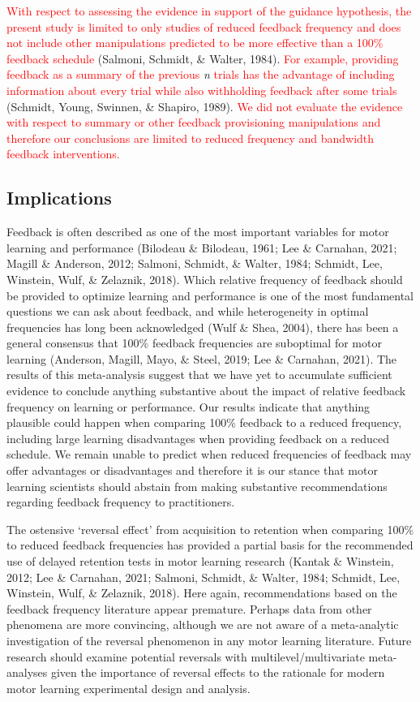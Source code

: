 \documentclass[
  english,
  man, donotrepeattitle,mask,floatsintext]{apa7}
\begin{document}
\textcolor{red}{With respect to assessing the evidence in support of the guidance hypothesis, the present study is limited to only studies of reduced feedback frequency and does not include other manipulations predicted to be more effective than a 100\% feedback schedule} (Salmoni, Schmidt, \& Walter, 1984). \textcolor{red}{For example, providing feedback as a summary of the previous} \emph{n} \textcolor{red}{trials has the advantage of including information about every trial while also withholding feedback after some trials} (Schmidt, Young, Swinnen, \& Shapiro, 1989). \textcolor{red}{We did not evaluate the evidence with respect to summary or other feedback provisioning manipulations and therefore our conclusions are limited to reduced frequency and bandwidth feedback interventions.}

\hypertarget{implications}{%
\subsection{Implications}\label{implications}}

Feedback is often described as one of the most important variables for motor learning and performance (Bilodeau \& Bilodeau, 1961; Lee \& Carnahan, 2021; Magill \& Anderson, 2012; Salmoni, Schmidt, \& Walter, 1984; Schmidt, Lee, Winstein, Wulf, \& Zelaznik, 2018). Which relative frequency of feedback should be provided to optimize learning and performance is one of the most fundamental questions we can ask about feedback, and while heterogeneity in optimal frequencies has long been acknowledged (Wulf \& Shea, 2004), there has been a general consensus that 100\% feedback frequencies are suboptimal for motor learning (Anderson, Magill, Mayo, \& Steel, 2019; Lee \& Carnahan, 2021). The results of this meta-analysis suggest that we have yet to accumulate sufficient evidence to conclude anything substantive about the impact of relative feedback frequency on learning or performance. Our results indicate that anything plausible could happen when comparing 100\% feedback to a reduced frequency, including large learning disadvantages when providing feedback on a reduced schedule. We remain unable to predict when reduced frequencies of feedback may offer advantages or disadvantages and therefore it is our stance that motor learning scientists should abstain from making substantive recommendations regarding feedback frequency to practitioners.

The ostensive `reversal effect' from acquisition to retention when comparing 100\% to reduced feedback frequencies has provided a partial basis for the recommended use of delayed retention tests in motor learning research (Kantak \& Winstein, 2012; Lee \& Carnahan, 2021; Salmoni, Schmidt, \& Walter, 1984; Schmidt, Lee, Winstein, Wulf, \& Zelaznik, 2018). Here again, recommendations based on the feedback frequency literature appear premature. Perhaps data from other phenomena are more convincing, although we are not aware of a meta-analytic investigation of the reversal phenomenon in any motor learning literature. Future research should examine potential reversals with multilevel/multivariate meta-analyses given the importance of reversal effects to the rationale for modern motor learning experimental design and analysis.
\end{document}
